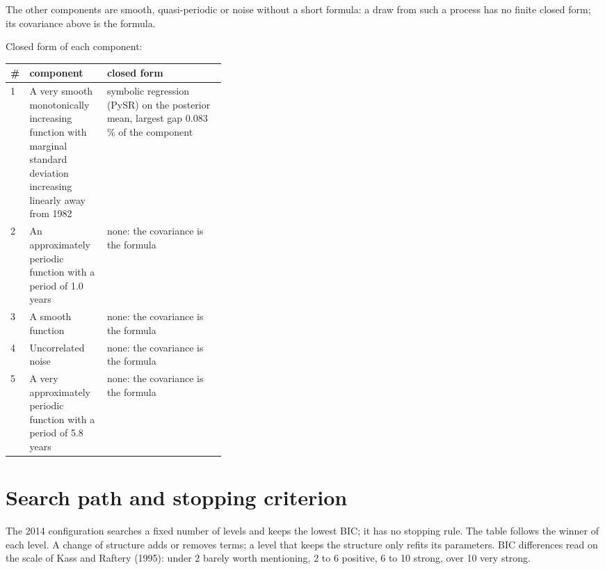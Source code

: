 \documentclass[11pt,a4paper]{article}
\begin{document}
The other components are smooth, quasi-periodic or noise without a short formula: a draw from such a process has no finite closed form; its covariance above is the formula.

Closed form of each component:

\begin{center}\footnotesize
\begin{tabular}{lp{0.36\linewidth}l}
\toprule
\# & component & closed form \\
\midrule
1 & A very smooth monotonically increasing function with marginal standard deviation increasing linearly away from 1982 & symbolic regression (PySR) on the posterior mean, largest gap 0.083 \% of the component \\
2 & An approximately periodic function with a period of 1.0 years & none: the covariance is the formula \\
3 & A smooth function & none: the covariance is the formula \\
4 & Uncorrelated noise & none: the covariance is the formula \\
5 & A very approximately periodic function with a period of 5.8 years & none: the covariance is the formula \\
\bottomrule
\end{tabular}
\end{center}

\section*{Search path and stopping criterion}

The 2014 configuration searches a fixed number of levels and keeps the lowest BIC; it has no stopping rule. The table follows the winner of each level. A change of structure adds or removes terms; a level that keeps the structure only refits its parameters. BIC differences read on the scale of Kass and Raftery (1995): under 2 barely worth mentioning, 2 to 6 positive, 6 to 10 strong, over 10 very strong.
\end{document}
